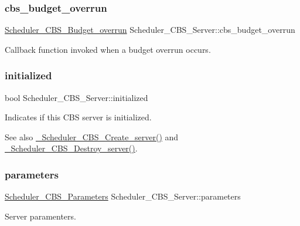 \subsubsection{\texorpdfstring{cbs\_budget\_overrun}{cbs\_budget\_overrun}}
{\footnotesize\ttfamily \mbox{\hyperlink{group__RTEMSScoreSchedulerCBS_ga71e1a7a66ea3c1fcb7e25e900f773858}{Scheduler\+\_\+\+C\+B\+S\+\_\+\+Budget\+\_\+overrun}} Scheduler\+\_\+\+C\+B\+S\+\_\+\+Server\+::cbs\+\_\+budget\+\_\+overrun}

Callback function invoked when a budget overrun occurs. \mbox{\label{structScheduler__CBS__Server_ac04a4372423b4dd93e1d1bb7c8150bc6}} 
\subsubsection{\texorpdfstring{initialized}{initialized}}
{\footnotesize\ttfamily bool Scheduler\+\_\+\+C\+B\+S\+\_\+\+Server\+::initialized}



Indicates if this C\+BS server is initialized. 

\begin{DoxySeeAlso}{See also}
\mbox{\hyperlink{group__RTEMSScoreSchedulerCBS_ga321aafe13a9f4b7815c5250789419dcd}{\+\_\+\+Scheduler\+\_\+\+C\+B\+S\+\_\+\+Create\+\_\+server()}} and \mbox{\hyperlink{group__RTEMSScoreSchedulerCBS_gaa0492d484f48089e4418faa2ed3a83f9}{\+\_\+\+Scheduler\+\_\+\+C\+B\+S\+\_\+\+Destroy\+\_\+server()}}. 
\end{DoxySeeAlso}
\mbox{\label{structScheduler__CBS__Server_a684fe7209466d1c4425285f9739fec12}} 
\subsubsection{\texorpdfstring{parameters}{parameters}}
{\footnotesize\ttfamily \mbox{\hyperlink{structScheduler__CBS__Parameters}{Scheduler\+\_\+\+C\+B\+S\+\_\+\+Parameters}} Scheduler\+\_\+\+C\+B\+S\+\_\+\+Server\+::parameters}

Server paramenters. \mbox{\label{structScheduler__CBS__Server_abb5087e9bdf465873ac70c42f5ad7b8a}} 
